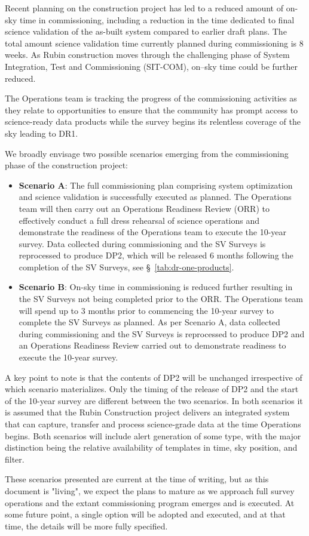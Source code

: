 Recent planning on the construction project has led to a reduced amount of on-sky time in commissioning, including a reduction in the time dedicated to final science validation of the as-built system compared to earlier draft plans.
The total amount science validation time currently planned during commissioning is 8 weeks. 
As Rubin construction moves through the challenging phase of System Integration, Test and Commissioning (SIT-COM), on--sky time could be further reduced.

The Operations team is tracking the progress of the commissioning activities as they relate to \es opportunities to ensure that the community has prompt access to science-ready data products while the survey begins its relentless coverage of the sky leading to DR1.

We broadly envisage two possible scenarios emerging from the commissioning phase of the construction project: 

\begin{itemize}
\item \textbf{Scenario A}:
The full commissioning plan comprising system optimization and science validation is successfully executed as planned. 
The Operations team will then carry out an Operations Readiness Review (ORR) to effectively conduct a full dress rehearsal of science operations and demonstrate the readiness of the Operations team to execute the 10-year survey. 
Data collected during commissioning and the SV Surveys is reprocessed to produce DP2, which will be released 6 months following the completion of the SV Surveys, see \S~\ref{tab:dr-one-products}.

\item \textbf{Scenario B}:
On-sky time in commissioning is reduced further resulting in the SV Surveys not being completed prior to the ORR. 
The Operations team will spend up to 3 months prior to commencing the 10-year survey to complete the SV Surveys as planned. 
As per Scenario A, data collected during commissioning and the SV Surveys is reprocessed to produce DP2 and an Operations Readiness Review carried out to demonstrate readiness to execute the 10-year survey. 

\end{itemize}

A key point to note is that the contents of DP2 will be unchanged irrespective of which scenario materializes.  
Only the timing of the release of DP2 and the start of the 10-year survey are different between the two scenarios. 
In both scenarios it is assumed that the Rubin Construction project delivers an integrated system that can capture, transfer and process science-grade data at the time Operations begins.
Both scenarios will include alert generation of some type, with the major distinction being the relative availability of templates in time, sky position, and filter.


These scenarios presented are current at the time of writing, but as this document is "living", we expect the plans to mature as we approach full survey operations and the extant commissioning program emerges and is executed.
At some future point, a single option will be adopted and executed, and at that time, the details will be more fully specified.
